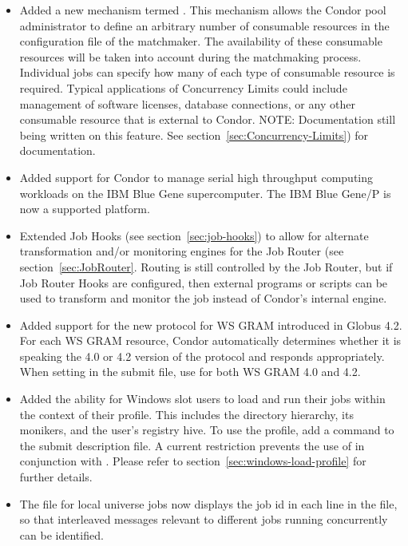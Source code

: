 \begin{itemize}

\item Added a new mechanism termed .  This
mechanism allows the Condor pool administrator to define an arbitrary
number of consumable resources in the configuration file of the
matchmaker.  The availability of these consumable resources will be taken
into account during the matchmaking process.  Individual jobs can specify
how many of each type of consumable resource is required.  
Typical applications of Concurrency Limits could include management of
software licenses, database connections, or any other consumable resource
that is external to Condor.  NOTE: Documentation still being written on
this feature.
See section~\ref{sec:Concurrency-Limits}) for documentation.

\item Added support for Condor to manage serial high throughput computing
workloads on the IBM Blue Gene supercomputer.  The IBM Blue Gene/P is now
a supported platform.

\item Extended Job Hooks (see section~\ref{sec:job-hooks}) to allow for
alternate transformation and/or monitoring engines for the Job Router (see
section~\ref{sec:JobRouter}.  Routing is still controlled by the Job
Router, but if Job Router Hooks are configured, then external programs or
scripts can be used to transform and monitor the job instead of Condor's
internal engine.

\item Added support for the new protocol for WS GRAM introduced in Globus
4.2. For each WS GRAM resource, Condor automatically determines whether it is
speaking the 4.0 or 4.2 version of the protocol and responds appropriately.
When setting  in the submit file, use
 for both WS GRAM 4.0 and 4.2.

\item Added the ability for Windows slot users to load and run their jobs
within the context of their profile. 
This includes the  directory 
hierarchy, its monikers, and the user's registry hive.
To use the profile, add a  command to the 
submit description file.  A current restriction prevents the use of
in conjunction with . Please refer to 
section~\ref{sec:windows-load-profile} for further details.

\item The  file for local universe jobs now displays the job id
in each line in the file, so that interleaved messages relevant to
different jobs running concurrently can be identified.


\end{itemize}
